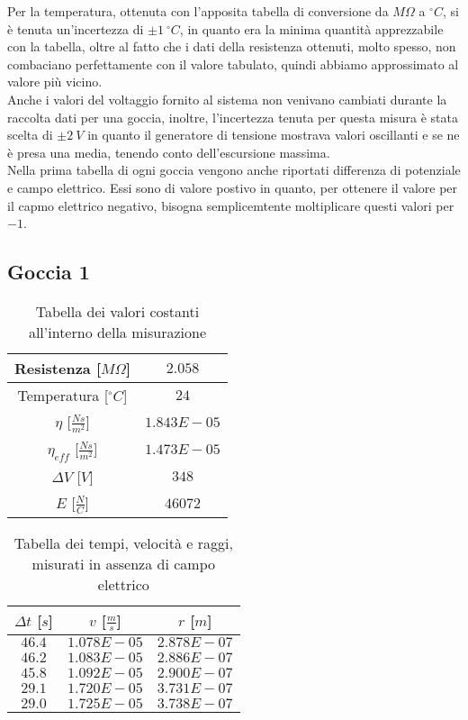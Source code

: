 \documentclass{article}
\begin{document}
Per la temperatura, ottenuta con l'apposita tabella di conversione da $M\Omega$ a $^\circ C$, si è tenuta un'incertezza di $\pm1\ ^\circ C$, in quanto era la minima quantità apprezzabile con la tabella, oltre al fatto che i dati della resistenza ottenuti, molto spesso, non combaciano perfettamente con il valore tabulato, quindi abbiamo approssimato al valore più vicino.\\

Anche i valori del voltaggio fornito al sistema non venivano cambiati durante la raccolta dati per una goccia, inoltre, l'incertezza tenuta per questa misura è stata scelta di $\pm2\ V$ in quanto il generatore di tensione mostrava valori oscillanti e se ne è presa una media, tenendo conto dell'escursione massima.\\

Nella prima tabella di ogni goccia vengono anche riportati differenza di potenziale e campo elettrico. Essi sono di valore postivo in quanto, per ottenere il valore per il capmo elettrico negativo, bisogna semplicemtente moltiplicare questi valori per $-1$.

\subsection{Goccia 1}
\begin{multicols}{2}
	
\begin{table}[H]
	\centering
	\begin{tabular}{| c | c |}
		\hline
		Resistenza [$M\Omega$] & $2.058$ \\
		\hline
		Temperatura [$^\circ C$] & $24$ \\
		\hline
		$\eta$ [$\frac{Ns}{m^2}$] & $1.843E-05$\\
		\hline
		$\eta_{eff}$ [$\frac{Ns}{m^2}$] & $1.473E-05$\\
		\hline
		$\Delta V$ [$V$] & $348$ \\
		\hline
		$E$ [$\frac N C$] & $46072$\\
		\hline
	\end{tabular}
	\caption{Tabella dei valori costanti all'interno della misurazione}
	\label{}
\end{table}

\columnbreak

\begin{table}[H]
	\centering
	\begin{tabular}{| c | c | c |}
		\hline
		$\Delta t$ [$s$] & $v$ [$\frac ms$] & $r$ [$m$] \\
		\hline
		$46.4$ & $1.078E-05$ & $2.878E-07$ \\
		$46.2$ & $1.083E-05$ & $2.886E-07$ \\
		$45.8$ & $1.092E-05$ & $2.900E-07$ \\
		$29.1$ & $1.720E-05$ & $3.731E-07$ \\
		$29.0$ & $1.725E-05$ & $3.738E-07$ \\
		\hline
	\end{tabular}
	\caption{Tabella dei tempi, velocità e raggi, misurati in assenza di campo elettrico}
	\label{}
\end{table}

\end{multicols}
\end{document}
